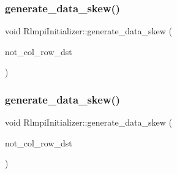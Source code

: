 \subsubsection{\texorpdfstring{generate\_data\_skew()}{generate\_data\_skew()}\hspace{0.1cm}{\footnotesize\ttfamily [1/4]}}
{\footnotesize\ttfamily void Rlmpi\+Initializer\+::generate\+\_\+data\+\_\+skew (\begin{DoxyParamCaption}\item[{const vector$<$ vector$<$ \mbox{\hyperlink{include_2RlmpiShared_8h_a69782ffde89d45e86308f10afedf08a6}{int8\+L\+DM}} $>$ $>$ \&}]{not\+\_\+col\+\_\+row\+\_\+dst }\end{DoxyParamCaption})\hspace{0.3cm}{\ttfamily [protected]}}

\mbox{\label{classRlmpiInitializer_a538c284d2e67fbbdcbeb4e05aaaa546a}} 
\subsubsection{\texorpdfstring{generate\_data\_skew()}{generate\_data\_skew()}\hspace{0.1cm}{\footnotesize\ttfamily [2/4]}}
{\footnotesize\ttfamily void Rlmpi\+Initializer\+::generate\+\_\+data\+\_\+skew (\begin{DoxyParamCaption}\item[{const vector$<$ vector$<$ \mbox{\hyperlink{include_2RlmpiShared_8h_a69782ffde89d45e86308f10afedf08a6}{int8\+L\+DM}} $>$ $>$ \&}]{not\+\_\+col\+\_\+row\+\_\+dst }\end{DoxyParamCaption})\hspace{0.3cm}{\ttfamily [protected]}}

\mbox{\label{classRlmpiInitializer_ab02ee7a3cbda15a39f3e2e7218c92cc2}} 
